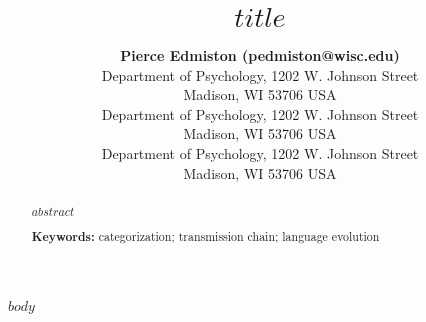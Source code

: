 \documentclass[10pt,letterpaper]{article}
\title{$title$}
\author{{\large \bf Pierce Edmiston (pedmiston@wisc.edu)} \\
  Department of Psychology, 1202 W. Johnson Street \\
  Madison, WI 53706 USA
  \AND {\large \bf Marcus Perlman} \\
  Department of Psychology, 1202 W. Johnson Street \\
  Madison, WI 53706 USA
  \AND {\large \bf Gary Lupyan} \\
  Department of Psychology, 1202 W. Johnson Street \\
  Madison, WI 53706 USA}
\begin{document}
\maketitle

\begin{abstract}
$abstract$

\textbf{Keywords:}
categorization; transmission chain; language evolution

\end{abstract}

$body$



\end{document}
